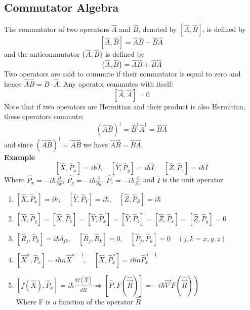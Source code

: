 \subsection{Commutator Algebra}
The commutator of two operators $\hat{A}$ and $\hat{B}$, denoted by $[\hat{A}, \hat{B}]$, is defined by
$$
[\hat{A}, \hat{B}]=\hat{A} \hat{B}-\hat{B} \hat{A}
$$
and the anticommutator $\{\hat{A}, \hat{B}\}$ is defined by
$$
\{\hat{A}, \hat{B}\}=\hat{A} \hat{B}+\hat{B} \hat{A}
$$
Two operators are said to commute if their commutator is equal to zero and hence $\hat{A} \hat{B}=\hat{B} \cdot \hat{A}$. Any operator commutes with itself:
$$
[\hat{A}, \hat{A}]=0
$$
Note that if two operators are Hermitian and their product is also Hermitian, these operators commute:
$$
(\hat{A} \hat{B})^{\dagger}=\hat{B}^{\dagger} \hat{A}^{\dagger}=\hat{B} \hat{A}
$$
and since $(\hat{A} \hat{B})^{\dagger}=\hat{A} \hat{B}$ we have $\hat{A} \hat{B}=\hat{B} \hat{A}$.\\
\textbf{Example}\\
$$\left[\hat{X}, \hat{P}_{x}\right]=i \hbar \hat{I}, \quad\left[\hat{Y}, \hat{P}_{y}\right]=i \hbar \hat{I}, \quad\left[\hat{Z}, \hat{P}_{z}\right]=i \hbar \hat{I}$$
Where $\hat{P_x}=-i\hbar \frac{\partial}{\partial x}$, $\hat{P_y}=-i\hbar \frac{\partial}{\partial y}$, $\hat{P_z}=-i\hbar \frac{\partial}{\partial z}$ and $\hat{I}$ is the unit operator.\\
\begin{note}
	\begin{enumerate}
		\item $\left[\hat{X}, \hat{P}_{x}\right]=i \hbar, \quad\left[\hat{Y}, \hat{P}_{Y}\right]=i \hbar, \quad\left[\hat{Z}, \hat{P}_{Z}\right]=i \hbar$
		\item $\left[\hat{X}, \hat{P}_{y}\right]=\left[\hat{X}, \hat{P}_{z}\right]=\left[\hat{Y}, \hat{P}_{x}\right]=\left[\hat{Y}, \hat{P}_{z}\right]=\left[\hat{Z}, \hat{P}_{x}\right]=\left[\hat{Z}, \hat{P}_{y}\right]=0$
		\item $\left[\hat{R}_{j}, \hat{P}_{k}\right]=i \hbar \delta_{j k}, \quad\left[\hat{R}_{j}, \hat{R}_{k}\right]=0, \quad\left[\hat{P}_{j}, \hat{P}_{k}\right]=0 \quad(j, k=x, y, z)$
		\item $\left[\hat{X}^{n}, \hat{P}_{x}\right]=i \hbar n \hat{X}^{n-1}, \quad\left[\hat{X}, \hat{P}_{x}^{n}\right]=i \hbar n \hat{P}_{x}^{n-1}$
		\item $\left.\left[  f(\hat{X}), \hat{P}_{x}\right]=i \hbar \frac{d f(\hat{X})}{d \hat{X}} \Longrightarrow[\hat{P}, F(\hat{\vec{R}})]=-i \hbar \vec{\nabla} F(\hat{\vec{R}})\right)$\\
		Where F is a function of the operator $\hat{R}$
	\end{enumerate}
\end{note}
